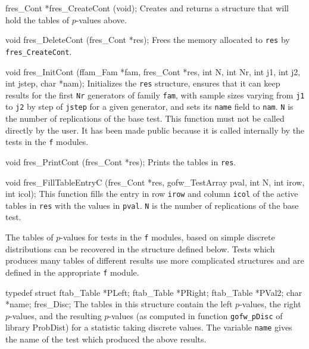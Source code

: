 fres_Cont *fres_CreateCont (void);
\endcode
 \tab 
  Creates and returns a structure that will hold the tables of $p$-values
  above. 
 \endtab
\code


void fres_DeleteCont (fres_Cont *res);
\endcode
 \tab 
  Frees the memory allocated to {\tt res} by {\tt fres\_CreateCont}.
 \endtab
\code
\hide

void fres_InitCont (ffam_Fam *fam, fres_Cont *res, int N,
                    int Nr, int j1, int j2, int jstep, char *nam);
\endcode
 \tab 
   Initializes the {\tt res} structure, ensures that it can keep results
   for the first {\tt Nr} generators of family {\tt fam}, with sample sizes
   varying from {\tt j1} to {\tt j2} by step of {\tt jstep} for a given
   generator, and sets its {\tt name} field to {\tt nam}.  {\tt N}
   is the number of replications of the base test. This function
   must not be called directly by the user. It has been made public because
   it is called internally by the tests in the {\tt f} modules.
 \endtab
\code
\endhide

void fres_PrintCont (fres_Cont *res);
\endcode
 \tab Prints the tables in {\tt res}.
 \endtab
\code


void fres_FillTableEntryC (fres_Cont *res, gofw_TestArray pval, int N,
                           int irow, int icol);
\endcode
 \tab This function fills the entry in row {\tt irow} and column {\tt icol}
  of the active tables in {\tt res} with the values in {\tt pval}. {\tt N}
  is the number of replications of the base test.
 \endtab





The tables of $p$-values for tests in the {\tt f} modules, based on simple
discrete distributions can be recovered in the structure defined below.
Tests which produces many tables of different results use more complicated
structures and are defined in the appropriate {\tt f} module.

\code

typedef struct {
   ftab_Table *PLeft;
   ftab_Table *PRight;
   ftab_Table *PVal2;
   char *name;
} fres_Disc;
\endcode
 \tab
  The tables in this structure contain the left $p$-values,
  the right $p$-values, and the resulting
  $p$-values (as computed in function {\tt gofw\_pDisc} of library
   ProbDist) for a statistic taking discrete values. The variable 
  {\tt name} gives the name of the test which produced the above results.
 \endtab
\code


